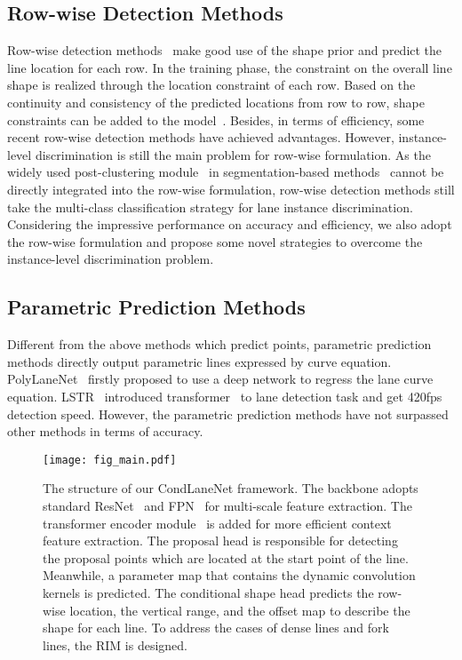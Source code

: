 \documentclass[10pt,twocolumn,letterpaper]{article}
\begin{document}
\subsection{Row-wise Detection Methods}
Row-wise detection methods~\cite{qin2020ultra, philion2019fastdraw, yoo2020end} make good use of the shape prior and predict the line location for each row. In the training phase, the constraint on the overall line shape is realized through the location constraint of each row. Based on the continuity and consistency of the predicted locations from row to row, shape constraints can be added to the model~\cite{philion2019fastdraw, qin2020ultra}. Besides, in terms of efficiency, some recent row-wise detection methods\cite{qin2020ultra, yoo2020end, hou2020inter} have achieved advantages.
However, instance-level discrimination is still the main problem for row-wise formulation. 
As the widely used post-clustering
module~\cite{de2017semantic} in segmentation-based methods~\cite{neven2018towards,ko2020key} cannot be directly integrated into the row-wise formulation, row-wise detection methods still take the multi-class classification strategy for lane instance discrimination.
Considering the impressive performance on accuracy and efficiency, we also adopt the row-wise formulation and propose some novel strategies to overcome the instance-level discrimination problem.

\subsection{Parametric Prediction Methods}
Different from the above methods which predict points, parametric prediction methods directly output parametric lines expressed by curve equation. PolyLaneNet~\cite{tabelini2020polylanenet} firstly proposed to use a deep network to regress the lane curve equation. LSTR~\cite{liu2021end} introduced transformer~\cite{vaswani2017attention} to lane detection task and get 420fps detection speed. However, the parametric prediction methods have not surpassed other methods in terms of accuracy.

{\begin{figure*}[ht]
\centering
\texttt{[image: fig\_main.pdf]}
\caption{The structure of our CondLaneNet framework. The backbone adopts standard ResNet~\cite{he2016deep} and FPN~\cite{lin2017feature} for multi-scale feature extraction. The transformer encoder module~\cite{vaswani2017attention} is added for more efficient context feature extraction. The proposal head is responsible for detecting the proposal points which are located at the start point of the line. Meanwhile, a parameter map that contains the dynamic convolution kernels is predicted. The conditional shape head predicts the row-wise location, the vertical range, and the offset map to describe the shape for each line. To address the cases of dense lines and fork lines, the RIM is designed. }
\label{Fig.main2} \end{figure*}}
\end{document}
